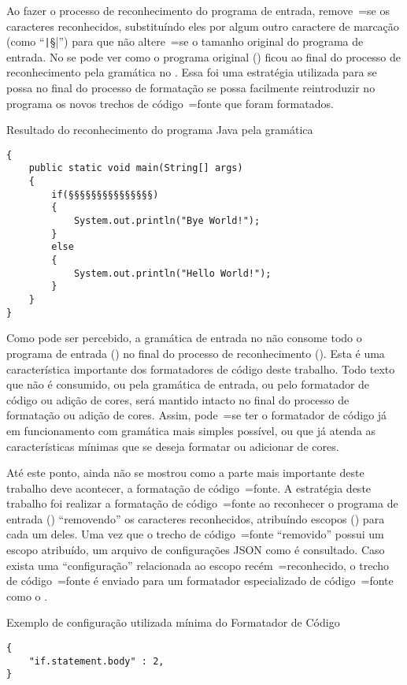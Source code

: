 Ao fazer o processo de reconhecimento do programa de entrada,
remove~=se os caracteres reconhecidos,
substituíndo eles por algum outro caractere de marcação (como ``\texttt|§|'') para que não altere~=se o tamanho original do programa de entrada.
No  se pode ver como o programa original () ficou ao final do processo de reconhecimento pela gramática no .
Essa foi uma estratégia utilizada para se possa no final do processo de formatação se possa facilmente reintroduzir no programa os novos trechos de código~=fonte que foram formatados.
\begin{code}
\caption{Resultado do reconhecimento do programa Java pela gramática}
\label{code:resultadoDoReconhecimentoDoProgramaJava}
\begin{verbatim}
{
    public static void main(String[] args)
    {
        if(§§§§§§§§§§§§§§§)
        {
            System.out.println("Bye World!");
        }
        else
        {
            System.out.println("Hello World!");
        }
    }
}
\end{verbatim}
\end{code}

Como pode ser percebido,
a gramática de entrada no  não consome todo o programa de entrada () no final do processo de reconhecimento ().
Esta é uma característica importante dos formatadores de código deste trabalho.
Todo texto que não é consumido,
ou pela gramática de entrada,
ou pelo formatador de código ou
adição de cores,
será mantido intacto no final do processo de formatação ou
adição de cores.
Assim,
pode~=se ter o formatador de código já em funcionamento com gramática mais simples possível,
ou que já atenda as características mínimas que se deseja formatar ou
adicionar de cores.

Até este ponto,
ainda não se mostrou como a parte mais importante deste trabalho deve acontecer,
a formatação de código~=fonte.
A estratégia deste trabalho foi realizar a formatação de código~=fonte ao reconhecer o programa de entrada () ``removendo'' os caracteres reconhecidos,
atribuíndo escopos () para cada um deles.
Uma vez que o trecho de código~=fonte ``removido'' possui um escopo atribuído,
um arquivo de configurações JSON como  é consultado.
Caso exista uma ``configuração'' relacionada ao escopo recém~=reconhecido,
o trecho de código~=fonte é enviado para um formatador especializado de código~=fonte como o .
\begin{code}
\caption{Exemplo de configuração utilizada mínima do Formatador de Código}
\label{code:exemploDeConfiguracaoUtilizadaMinimaDoFormatadorDeCodigo}
\begin{verbatim}
{
    "if.statement.body" : 2,
}
\end{verbatim}
\end{code}


